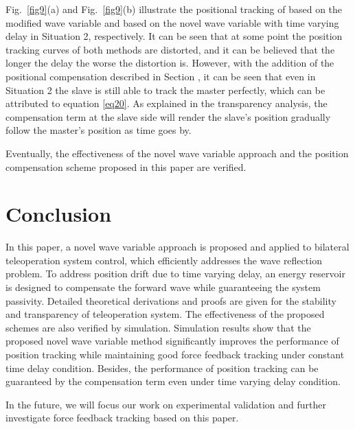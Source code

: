 \par Fig.~\ref{fig9}(a) and Fig.~\ref{fig9}(b) illustrate the positional tracking of based on
the modified wave variable and based on the novel wave variable
with time varying delay in Situation 2, respectively.
It can be seen that
at some point the position tracking curves of both methods are distorted,
and it can be believed that the longer the delay the worse the distortion is.
However, with the addition of the positional compensation described in Section \uppercase\expandafter{} ,
it can be seen that even in Situation 2 the slave is still able to track the master perfectly,
which can be attributed to equation \eqref{eq20}.
As explained in the transparency analysis,
the compensation term at the slave side will render the slave's position
gradually follow the master's position as time goes by.

\par Eventually,
the effectiveness of the novel wave variable approach 
and the position compensation scheme proposed
in this paper are verified.


\section{Conclusion}
In this paper,
a novel wave variable approach is proposed and applied to bilateral teleoperation system control,
which efficiently addresses the wave reflection problem. 
To address position drift due to time varying delay,
an energy reservoir is designed to compensate the forward wave while guaranteeing the system passivity.
Detailed theoretical derivations 
and proofs are given for the stability and transparency of teleoperation system.
The effectiveness of the proposed schemes are also verified by simulation.
Simulation results show that the proposed novel wave variable method
significantly improves the performance of position tracking
while maintaining good force feedback tracking under constant time delay condition.
Besides, the performance of position tracking can be guaranteed by the compensation term
even under time varying delay condition.
\par In the future,
we will focus our work 
on experimental validation and 
further investigate force feedback tracking based on this paper.
%  
% 


